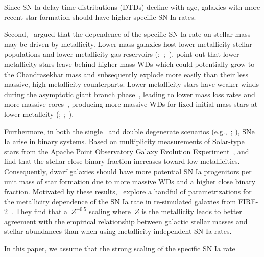 Since SN Ia delay-time distributions (DTDs) decline with age, galaxies with
more recent star formation should have higher specific SN Ia rates.
\par
Second,~\citet{Kistler2013} argued that the dependence of the specific SN Ia
rate on stellar mass may be driven by metallicity.
Lower mass galaxies host lower metallicity stellar populations
\citep{Gallazzi2005, Kirby2013} and lower metallicity gas reservoirs
(\citealp{Tremonti2004};~\citealp*{Zahid2011};~\citealp{Andrews2013,
Zahid2014}).
\citet{Kistler2013} point out that lower metallicity stars leave behind higher
mass WDs which could potentially grow to the Chandrasekhar mass and
subsequently explode more easily than their less massive, high metallicity
counterparts.
Lower metallicity stars have weaker winds during the asymptotic giant branch
phase~\citep{Willson2000, Marigo2007}, leading to lower mass loss rates and
more massive cores~\citep{Kalirai2014}, producing more massive WDs for fixed
initial mass stars at lower metallcity (\citealp{Umeda1999};
\citealp*{Meng2008};~\citealp{Zhao2012}).
\par
Furthermore, in both the single~\citep[e.g.,][]{Whelan1973} and double
degenerate scenarios (e.g.,~\mbox{\citealp{Iben1984}};
\mbox{\citealp{Webbink1984}}), SNe Ia arise in binary systems.
Based on multiplicity measurements of Solar-type stars from the Apache Point
Observatory Galaxy Evolution Experiment~\citep[APOGEE;][]{Majewski2017},
\citet{Badenes2018} and~\citet*{Moe2019} find that the stellar close binary
fraction increases toward low metallicities.
Consequently, dwarf galaxies should have more potential SN Ia progenitors per
unit mass of star formation due to more massive WDs and a higher close binary
fraction.
Motivated by these results,~\citet{Gandhi2022} explore a handful of
parametrizations for the metallicity dependence of the SN Ia rate in
re-simulated galaxies from FIRE-2~\citep{Hopkins2018}.
They find that a~$Z^{-0.5}$ scaling where~$Z$ is the metallicity leads
to better agreement with the empirical relationship between galactic stellar
masses and stellar abundances than when using metallicity-independent SN Ia
rates.
\par
In this paper, we assume that the strong scaling of the specific SN Ia rate
